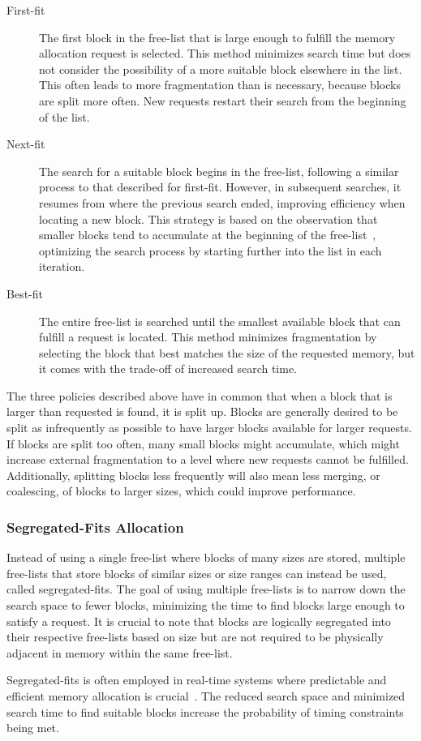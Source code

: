 \begin{description}
    \item[First-fit]
        The first block in the free-list that is large enough to fulfill the memory allocation request is selected. This method minimizes search time but does not consider the possibility of a more suitable block elsewhere in the list. This often leads to more fragmentation than is necessary, because blocks are split more often. New requests restart their search from the beginning of the list.
    \item[Next-fit]
        The search for a suitable block begins in the free-list, following a similar process to that described for first-fit. However, in subsequent searches, it resumes from where the previous search ended, improving efficiency when locating a new block. This strategy is based on the observation that smaller blocks tend to accumulate at the beginning of the free-list~\cite{gchandbook}, optimizing the search process by starting further into the list in each iteration.
    \item[Best-fit]
        The entire free-list is searched until the smallest available block that can fulfill a request is located. This method minimizes fragmentation by selecting the block that best matches the size of the requested memory, but it comes with the trade-off of increased search time.
\end{description}

The three policies described above have in common that when a block that is larger than requested is found, it is split up. Blocks are generally desired to be split as infrequently as possible to have larger blocks available for larger requests. If blocks are split too often, many small blocks might accumulate, which might increase external fragmentation to a level where new requests cannot be fulfilled. Additionally, splitting blocks less frequently will also mean less merging, or coalescing, of blocks to larger sizes, which could improve performance.

\subsubsection{Segregated-Fits Allocation}

Instead of using a single free-list where blocks of many sizes are stored, multiple free-lists that store blocks of similar sizes or size ranges can instead be used, called segregated-fits. The goal of using multiple free-lists is to narrow down the search space to fewer blocks, minimizing the time to find blocks large enough to satisfy a request. It is crucial to note that blocks are logically segregated into their respective free-lists based on size but are not required to be physically adjacent in memory within the same free-list. 

Segregated-fits is often employed in real-time systems where predictable and efficient memory allocation is crucial~\cite{gchandbook, TLSF}. The reduced search space and minimized search time to find suitable blocks increase the probability of timing constraints being met.

